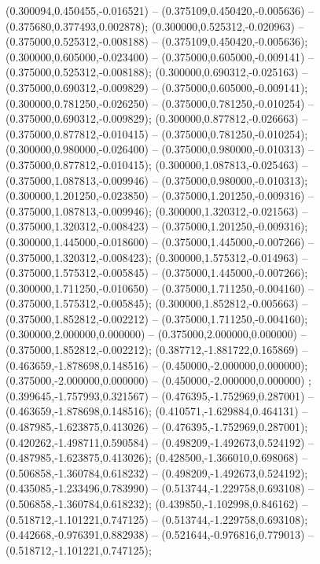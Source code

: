  (0.300094,0.450455,-0.016521) -- (0.375109,0.450420,-0.005636) -- (0.375680,0.377493,0.002878);
 (0.300000,0.525312,-0.020963) -- (0.375000,0.525312,-0.008188) -- (0.375109,0.450420,-0.005636);
 (0.300000,0.605000,-0.023400) -- (0.375000,0.605000,-0.009141) -- (0.375000,0.525312,-0.008188);
 (0.300000,0.690312,-0.025163) -- (0.375000,0.690312,-0.009829) -- (0.375000,0.605000,-0.009141);
 (0.300000,0.781250,-0.026250) -- (0.375000,0.781250,-0.010254) -- (0.375000,0.690312,-0.009829);
 (0.300000,0.877812,-0.026663) -- (0.375000,0.877812,-0.010415) -- (0.375000,0.781250,-0.010254);
 (0.300000,0.980000,-0.026400) -- (0.375000,0.980000,-0.010313) -- (0.375000,0.877812,-0.010415);
 (0.300000,1.087813,-0.025463) -- (0.375000,1.087813,-0.009946) -- (0.375000,0.980000,-0.010313);
 (0.300000,1.201250,-0.023850) -- (0.375000,1.201250,-0.009316) -- (0.375000,1.087813,-0.009946);
 (0.300000,1.320312,-0.021563) -- (0.375000,1.320312,-0.008423) -- (0.375000,1.201250,-0.009316);
 (0.300000,1.445000,-0.018600) -- (0.375000,1.445000,-0.007266) -- (0.375000,1.320312,-0.008423);
 (0.300000,1.575312,-0.014963) -- (0.375000,1.575312,-0.005845) -- (0.375000,1.445000,-0.007266);
 (0.300000,1.711250,-0.010650) -- (0.375000,1.711250,-0.004160) -- (0.375000,1.575312,-0.005845);
 (0.300000,1.852812,-0.005663) -- (0.375000,1.852812,-0.002212) -- (0.375000,1.711250,-0.004160);
 (0.300000,2.000000,0.000000) -- (0.375000,2.000000,0.000000) -- (0.375000,1.852812,-0.002212);
 (0.387712,-1.881722,0.165869) -- (0.463659,-1.878698,0.148516) -- (0.450000,-2.000000,0.000000);
 (0.375000,-2.000000,0.000000) -- (0.450000,-2.000000,0.000000) ;
 (0.399645,-1.757993,0.321567) -- (0.476395,-1.752969,0.287001) -- (0.463659,-1.878698,0.148516);
 (0.410571,-1.629884,0.464131) -- (0.487985,-1.623875,0.413026) -- (0.476395,-1.752969,0.287001);
 (0.420262,-1.498711,0.590584) -- (0.498209,-1.492673,0.524192) -- (0.487985,-1.623875,0.413026);
 (0.428500,-1.366010,0.698068) -- (0.506858,-1.360784,0.618232) -- (0.498209,-1.492673,0.524192);
 (0.435085,-1.233496,0.783990) -- (0.513744,-1.229758,0.693108) -- (0.506858,-1.360784,0.618232);
 (0.439850,-1.102998,0.846162) -- (0.518712,-1.101221,0.747125) -- (0.513744,-1.229758,0.693108);
 (0.442668,-0.976391,0.882938) -- (0.521644,-0.976816,0.779013) -- (0.518712,-1.101221,0.747125);
